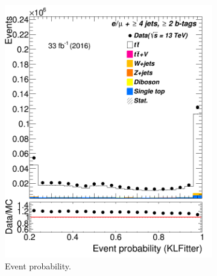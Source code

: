 \begin{figure}
\begin{subfigure}{0.35\textwidth}
		\includegraphics[width=\linewidth]{ControlPlots_emujets_2016_4incl_2incl/klf_eventProbability_emujets_2016.png}
		\caption{Event probability.} \label{fig:422}
	\end{subfigure}
	\medskip
	\begin{subfigure}{0.35\textwidth}

\end{subfigure}
\end{figure}
